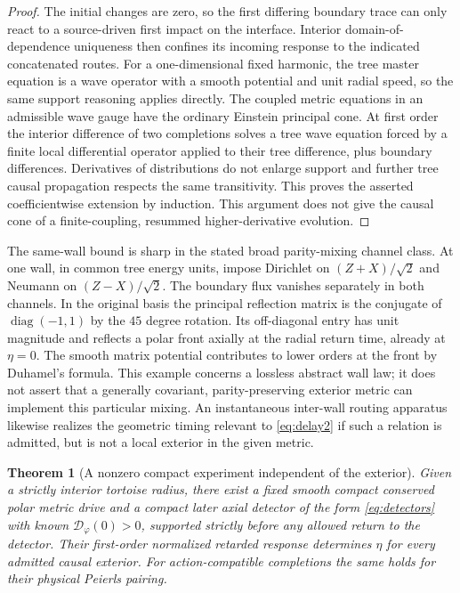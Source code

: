 \documentclass[11pt]{article}
\newtheorem{theorem}{Theorem}[section]
\begin{document}
\begin{proof}
The initial changes are zero, so the first differing boundary trace can only react to a source-driven first impact on the interface. Interior domain-of-dependence uniqueness then confines its incoming response to the indicated concatenated routes. For a one-dimensional fixed harmonic, the tree master equation is a wave operator with a smooth potential and unit radial speed, so the same support reasoning applies directly. The coupled metric equations in an admissible wave gauge have the ordinary Einstein principal cone. At first order the interior difference of two completions solves a tree wave equation forced by a finite local differential operator applied to their tree difference, plus boundary differences. Derivatives of distributions do not enlarge support and further tree causal propagation respects the same transitivity. This proves the asserted coefficientwise extension by induction. This argument does not give the causal cone of a finite-coupling, resummed higher-derivative evolution.
\end{proof}

The same-wall bound is sharp in the stated broad parity-mixing channel class. At one wall, in common tree energy units, impose Dirichlet on $(Z+X)/\sqrt2$ and Neumann on $(Z-X)/\sqrt2$. The boundary flux vanishes separately in both channels. In the original basis the principal reflection matrix is the conjugate of $\operatorname{diag}(-1,1)$ by the $45$ degree rotation. Its off-diagonal entry has unit magnitude and reflects a polar front axially at the radial return time, already at $\eta=0$. The smooth matrix potential contributes to lower orders at the front by Duhamel's formula. This example concerns a lossless abstract wall law; it does not assert that a generally covariant, parity-preserving exterior metric can implement this particular mixing. An instantaneous inter-wall routing apparatus likewise realizes the geometric timing relevant to \eqref{eq:delay2} if such a relation is admitted, but is not a local exterior in the given metric.

\begin{theorem}[A nonzero compact experiment independent of the exterior]\label{thm:early}
Given a strictly interior tortoise radius, there exist a fixed smooth compact conserved polar metric drive and a compact later axial detector of the form \eqref{eq:detectors} with known $\mathcal D_\varphi(0)>0$, supported strictly before any allowed return to the detector. Their first-order normalized retarded response determines $\eta$ for every admitted causal exterior. For action-compatible completions the same holds for their physical Peierls pairing.
\end{theorem}
\end{document}

